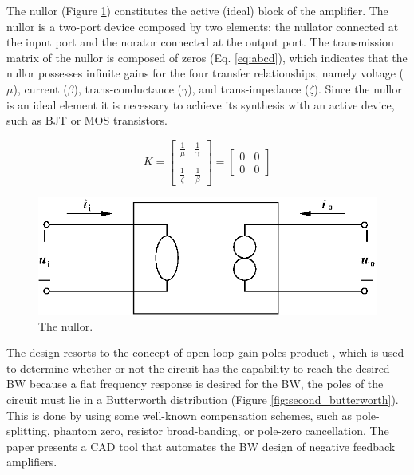 \documentclass[conference]{IEEEtran}
\begin{document}
The nullor (Figure \ref{fig:nullor}) constitutes the active (ideal) block of the amplifier. The nullor is a two-port device composed by two elements: the nullator connected at the input port and the norator connected at the output port. The transmission matrix of the nullor is composed of zeros (Eq. \ref{eq:abcd}), which indicates that the nullor possesses infinite gains for the four transfer relationships, namely voltage ($\mu$), current ($\beta$), trans-conductance ($\gamma$), and trans-impedance ($\zeta$). Since the nullor is an ideal element it is necessary to achieve its synthesis with an active device, such as BJT or MOS transistors.

\begin{equation}\label{eq:abcd}
{K}
=
\left [ \begin{array}{cc}
\frac{1}{\mu}& \frac{1}{\gamma} \\\\
\frac{1}{\zeta}& \frac{1}{\beta}
\end{array}
\right ]
=
\left [ \begin{array}{cc}
0 & 0 \\ 0 & 0
\end{array}
\right ]
\end{equation}

\begin{figure}[hbtp]
	\centering
	\includegraphics[scale=.7]{figures/fig_nullor.eps}
	\caption{The nullor.}
	\label{fig:nullor}
\end{figure}

The design resorts to the concept of open-loop gain-poles product \cite{verhoeven}, which is used to determine whether or not the circuit has the capability to reach the desired BW  because a flat frequency response is desired for the BW, the poles of the circuit must lie in a Butterworth distribution (Figure \ref{fig:second_butterworth}). This is done by using some well-known compensation schemes, such as pole-splitting, phantom zero, resistor broad-banding, or pole-zero cancellation. The paper presents a CAD tool that automates the BW design of negative feedback amplifiers.
\end{document}
